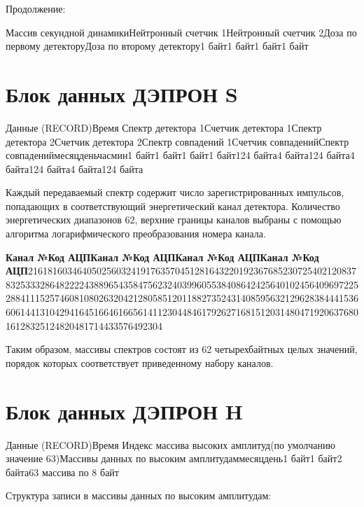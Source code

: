 Продолжение:


{\small Массив секундной динамикиНейтронный счетчик 1Нейтронный счетчик 2Доза по первому детекторуДоза по второму детектору}1 байт1 байт1 байт1 байт









\section{Блок данных ДЭПРОН S}




{\footnotesize Данные (RECORD)Время Спектр детектора 1Счетчик детектора 1Спектр детектора 2Счетчик детектора 2Спектр совпадений 1Счетчик совпаденийСпектр совпадениймесяцденьчасмин1 байт1 байт1 байт1 байт124 байта4 байта124 байта4 байта124 байта4 байта124 байта}


Каждый передаваемый спектр содержит число зарегистрированных импульсов, попадающих в соответствующий энергетический канал детектора. Количество энергетических диапазонов 62, верхние границы каналов выбраны с помощью алгоритма логарифмического преобразования номера канала.


\textbf{{\small Канал №Код АЦПКанал №Код АЦПКанал №Код АЦПКанал №Код АЦП}}{\small 216181603464050256032419176357045128164322019236768523072540212083783253332864822224388965435847562324039960553840864242564010245640969722528841115257460810802632042128058512011882735243140859563212962838444153660614413104294164516646166561411230448461792627168151203148047192063768016128325124820481714433576492304}


Таким образом, массивы спектров состоят из 62 четырехбайтных целых значений, порядок которых соответствует приведенному набору каналов.




\section{Блок данных ДЭПРОН H}


{\footnotesize Данные (RECORD)Время Индекс массива высоких амплитуд(по умолчанию значение 63)Массивы данных по высоким амплитудаммесяцдень1 байт1 байт2 байта63 массива  по 8 байт}



Структура записи в массивы данных по высоким амплитудам:



